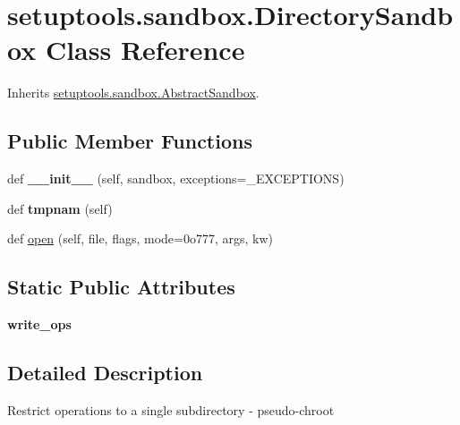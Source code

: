 \hypertarget{classsetuptools_1_1sandbox_1_1_directory_sandbox}{}\section{setuptools.\+sandbox.\+Directory\+Sandbox Class Reference}
\label{classsetuptools_1_1sandbox_1_1_directory_sandbox}


Inherits \hyperlink{classsetuptools_1_1sandbox_1_1_abstract_sandbox}{setuptools.\+sandbox.\+Abstract\+Sandbox}.

\subsection*{Public Member Functions}
\begin{DoxyCompactItemize}
\item 
\mbox{\label{classsetuptools_1_1sandbox_1_1_directory_sandbox_a64ffc139aee0544ed4eea933a195b894}} 
def {\bfseries \+\_\+\+\_\+init\+\_\+\+\_\+} (self, sandbox, exceptions=\+\_\+\+E\+X\+C\+E\+P\+T\+I\+O\+NS)
\item 
\mbox{\label{classsetuptools_1_1sandbox_1_1_directory_sandbox_a18c44e615e844e4b235eb65cdbc0faea}} 
def {\bfseries tmpnam} (self)
\item 
def \hyperlink{classsetuptools_1_1sandbox_1_1_directory_sandbox_aea079a4915b61a59a9e5fbf5b12053f2}{open} (self, file, flags, mode=0o777, args, kw)
\end{DoxyCompactItemize}
\subsection*{Static Public Attributes}
\begin{DoxyCompactItemize}
\item 
\mbox{\label{classsetuptools_1_1sandbox_1_1_directory_sandbox_aff584c6cf57155616b5e0c03db1dd317}} 
{\bfseries write\+\_\+ops}
\end{DoxyCompactItemize}


\subsection{Detailed Description}
\begin{DoxyVerb}Restrict operations to a single subdirectory - pseudo-chroot\end{DoxyVerb}
 


